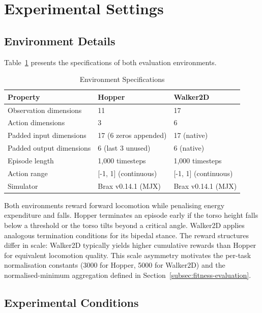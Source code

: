 \documentclass[12pt]{article}
\begin{document}
\section{Experimental Settings}
\label{sec:experimental-settings}

\subsection{Environment Details}
\label{subsec:environment-details}

Table~\ref{tab:env-specs} presents the specifications of both evaluation environments.

\begin{table}[h]
\centering
\caption{Environment Specifications}
\label{tab:env-specs}
\begin{tabular}{lll}
\toprule
\textbf{Property} & \textbf{Hopper} & \textbf{Walker2D} \\
\midrule
Observation dimensions & 11 & 17 \\
Action dimensions & 3 & 6 \\
Padded input dimensions & 17 (6 zeros appended) & 17 (native) \\
Padded output dimensions & 6 (last 3 unused) & 6 (native) \\
Episode length & 1,000 timesteps & 1,000 timesteps \\
Action range & [-1, 1] (continuous) & [-1, 1] (continuous) \\
Simulator & Brax v0.14.1 (MJX) & Brax v0.14.1 (MJX) \\
\bottomrule
\end{tabular}
\end{table}

Both environments reward forward locomotion while penalising energy expenditure and falls.
Hopper terminates an episode early if the torso height falls below a threshold or the torso tilts beyond a critical angle. Walker2D applies analogous termination conditions for its bipedal stance.
The reward structures differ in scale: Walker2D typically yields higher cumulative rewards than Hopper for equivalent locomotion quality.
This scale asymmetry motivates the per-task normalisation constants (3000 for Hopper, 5000 for Walker2D) and the normalised-minimum aggregation defined in Section~\ref{subsec:fitness-evaluation}.

\subsection{Experimental Conditions}
\label{subsec:experimental-conditions}
\end{document}
